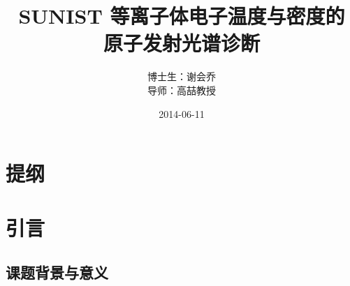 \begin{CJK*}{UTF8}{kai}

%

\title[答辩]{SUNIST 等离子体电子温度与密度的\\ 原子发射光谱诊断}

\author[谢会乔]{
\quad
\begin{minipage}{4cm}
    博士生：谢会乔\\
    导\quad 师：高\quad 喆\quad 教授
\end{minipage}
}


\date{2014-06-11}

\frame{\titlepage}

\section*{提纲}


\section{引言}

\subsection{课题背景与意义}


\end{CJK*}
